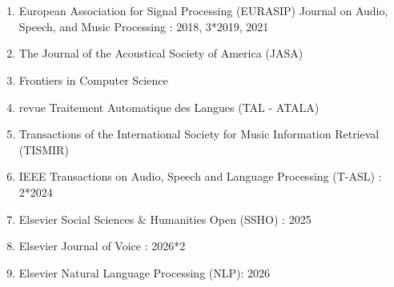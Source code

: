






\section{\EvalSec}
\subsection{\EvalJournal}
\begin{enumerate}[nosep, after=\strut, leftmargin=1em, itemsep=3pt]
\item European Association for Signal Processing (EURASIP) Journal on Audio, Speech, and Music Processing : 2018, 3*2019, 2021
\item The Journal of the Acoustical Society of America (JASA)
\item Frontiers in Computer Science
\item revue Traitement Automatique des Langues (TAL - ATALA)
\item Transactions of the International Society for Music Information Retrieval (TISMIR)
\item IEEE Transactions on Audio, Speech and Language Processing (T-ASL) : 2*2024
\item Elsevier Social Sciences \& Humanities Open (SSHO) : 2025
\item Elsevier Journal of Voice : 2026*2
\item Elsevier Natural Language Processing (NLP): 2026
\end{enumerate}
